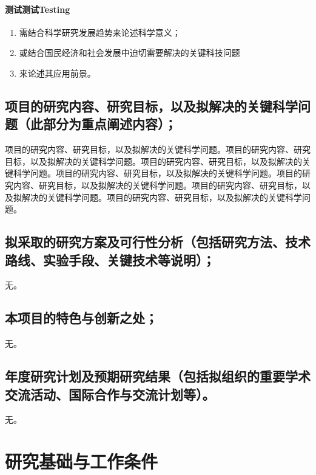 \documentclass{nsfc}
\begin{document}
\subsubsection{测试测试Testing}

\begin{enumerate}[1.]
    \item 需结合科学研究发展趋势来论述科学意义；
    \item 或结合国民经济和社会发展中迫切需要解决的关键科技问题
    \item 来论述其应用前景。
\end{enumerate}



\section{\textbf{项目的研究内容、研究目标，以及拟解决的关键科学问题}（此部分为重点阐述内容）；}

项目的研究内容、研究目标，以及拟解决的关键科学问题。项目的研究内容、研究目标，以及拟解决的关键科学问题。项目的研究内容、研究目标，以及拟解决的关键科学问题。项目的研究内容、研究目标，以及拟解决的关键科学问题。项目的研究内容、研究目标，以及拟解决的关键科学问题。项目的研究内容、研究目标，以及拟解决的关键科学问题。项目的研究内容、研究目标，以及拟解决的关键科学问题。

\section{\textbf{拟采取的研究方案及可行性分析}（包括研究方法、技术路线、实验手段、关键技术等说明）；}

无。

\section{\textbf{本项目的特色与创新之处；}}

无。

\section{\textbf{年度研究计划及预期研究结果}（包括拟组织的重要学术交流活动、国际合作与交流计划等）。}

无。

\chapter{研究基础与工作条件}
\end{document}
